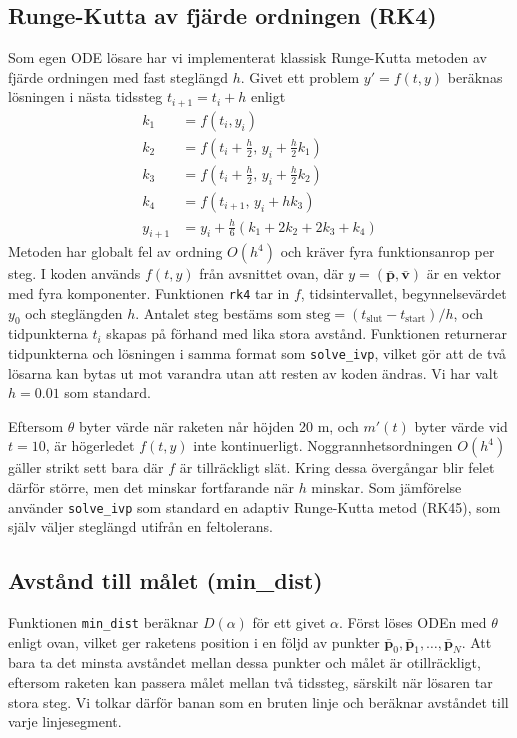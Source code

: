 \documentclass{article}
\newcommand{\bfbar}[1]{\ensuremath{\mathbf{\bar{#1}}}}
\begin{document}
\subsection{Runge-Kutta av fjärde ordningen (RK4)}
Som egen ODE lösare har vi implementerat klassisk Runge-Kutta metoden av fjärde ordningen med fast steglängd \(h\).
Givet ett problem \(y'=f(t,y)\) beräknas lösningen i nästa tidssteg \(t_{i+1}=t_i+h\) enligt
\[
    \begin{aligned}
        k_1     & = f(t_i, y_i)                                                \\
        k_2     & = f\left(t_i + \tfrac{h}{2},\, y_i + \tfrac{h}{2} k_1\right) \\
        k_3     & = f\left(t_i + \tfrac{h}{2},\, y_i + \tfrac{h}{2} k_2\right) \\
        k_4     & = f(t_{i+1},\, y_i + h k_3)                                  \\
        y_{i+1} & = y_i + \frac{h}{6}\left(k_1 + 2k_2 + 2k_3 + k_4\right)
    \end{aligned}
\]
Metoden har globalt fel av ordning \(O(h^4)\) och kräver fyra funktionsanrop per steg.
I koden används \(f(t,y)\) från avsnittet ovan, där \(y=(\bfbar{p},\bfbar{v})\) är en vektor med fyra komponenter. Funktionen \texttt{rk4} tar in \(f\), tidsintervallet, begynnelsevärdet \(y_0\) och steglängden \(h\). Antalet steg bestäms som \(\text{steg}=(t_{\text{slut}}-t_{\text{start}})/h\), och tidpunkterna \(t_i\) skapas på förhand med lika stora avstånd. Funktionen returnerar tidpunkterna och lösningen i samma format som \texttt{solve\_ivp}, vilket gör att de två lösarna kan bytas ut mot varandra utan att resten av koden ändras. Vi har valt \(h=0.01\) som standard.

Eftersom \(\theta\) byter värde när raketen når höjden 20 m, och \(m'(t)\) byter värde vid \(t=10\), är högerledet \(f(t,y)\) inte kontinuerligt.
Noggrannhetsordningen \(O(h^4)\) gäller strikt sett bara där \(f\) är tillräckligt slät.
Kring dessa övergångar blir felet därför större, men det minskar fortfarande när \(h\) minskar.
Som jämförelse använder \texttt{solve\_ivp} som standard en adaptiv Runge-Kutta metod (RK45), som själv väljer steglängd utifrån en feltolerans.

\subsection{Avstånd till målet (min\_dist)}
Funktionen \texttt{min\_dist} beräknar \(D(\alpha)\) för ett givet \(\alpha\).
Först löses ODEn med \(\theta\) enligt ovan, vilket ger raketens position i en följd av punkter \(\bfbar{p}_0, \bfbar{p}_1, \dots, \bfbar{p}_N\).
Att bara ta det minsta avståndet mellan dessa punkter och målet är otillräckligt, eftersom raketen kan passera målet mellan två tidssteg, särskilt när lösaren tar stora steg.
Vi tolkar därför banan som en bruten linje och beräknar avståndet till varje linjesegment.
\end{document}
